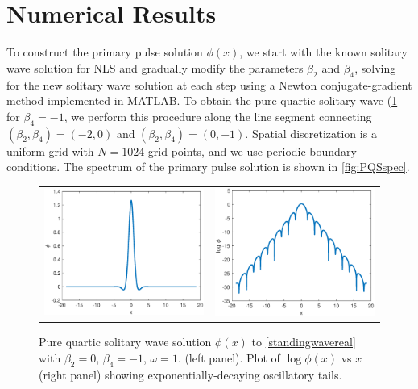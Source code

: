 \documentclass[12pt]{article}
\begin{document}
\section{Numerical Results}

To construct the primary pulse solution $\phi(x)$, we start with the known solitary wave solution for NLS and gradually modify the parameters $\beta_2$ and $\beta_4$, solving for the new solitary wave solution at each step using a Newton conjugate-gradient method \cite[Chapter 7.2.4]{YangCh7} implemented in MATLAB. To obtain the pure quartic solitary wave (\cref{fig:PQS} for $\beta_4 = -1$, we perform this procedure along the line segment connecting $(\beta_2, \beta_4) = (-2, 0)$ and $(\beta_2, \beta_4) = (0, -1)$. Spatial discretization is a uniform grid with $N = 1024$ grid points, and we use periodic boundary conditions. The spectrum of the primary pulse solution is shown in \cref{fig:PQSspec}.

\begin{figure}[H]
\centering
\begin{tabular}{cc}
\includegraphics[width=8cm]{images/PQS1.eps} &
\includegraphics[width=8cm]{images/PQS1log.eps}
\end{tabular}
\caption{Pure quartic solitary wave solution $\phi(x)$ to \cref{standingwavereal} with $\beta_2 = 0$, $\beta_4 = -1$, $\omega = 1$. (left panel). Plot of $\log \phi(x)$ vs $x$ (right panel) showing exponentially-decaying oscillatory tails. }
\label{fig:PQS}
\end{figure} 
\end{document}
